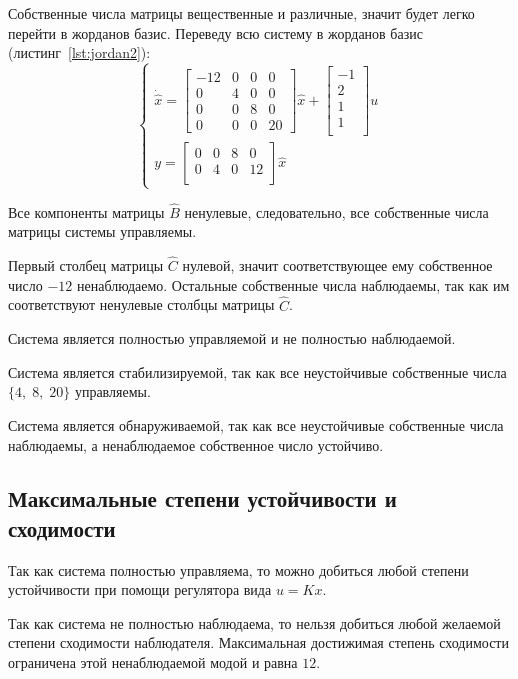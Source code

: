 \documentclass[a4paper,12pt]{article}
\begin{document}
	Собственные числа матрицы вещественные и различные, значит будет легко перейти в жорданов базис. Переведу всю систему в жорданов базис (листинг~\ref{lst:jordan2}):
	\[
	\begin{cases}
		\dot{\hat x} =
		\begin{bmatrix}
			-12 & 0 & 0 & 0 \\
			0 & 4 & 0 & 0 \\
			0 & 0 & 8 & 0 \\
			0 & 0 & 0 & 20
		\end{bmatrix}
		\hat x
		+ \begin{bmatrix}
			-1 \\ 2 \\ 1 \\ 1 \\
		\end{bmatrix} u
		\\[30pt]
		y = 
		\begin{bmatrix}
			0 & 0 & 8 & 0 \\
			0 & 4 & 0 & 12 \\
		\end{bmatrix}
		\hat x
	\end{cases}
	\]
	
Все компоненты матрицы \(\hat B\) ненулевые, следовательно, все собственные числа матрицы системы управляемы.

Первый столбец матрицы \(\hat C\) нулевой, значит соответствующее ему собственное число \(-12\) ненаблюдаемо. Остальные собственные числа наблюдаемы, так как им соответствуют ненулевые столбцы матрицы \(\hat C\).

Система является полностью управляемой и не полностью наблюдаемой.

Система является стабилизируемой, так как все неустойчивые собственные числа \(\{4,\; 8,\; 20\}\) управляемы.

Система является обнаруживаемой, так как все неустойчивые собственные числа наблюдаемы, а ненаблюдаемое собственное число устойчиво.
	
	\subsection{Максимальные степени устойчивости и сходимости}
	
	Так как система полностью управляема, то можно добиться любой степени устойчивости при помощи регулятора вида \(u = K x\).
	
	Так как система не полностью наблюдаема, то нельзя добиться любой желаемой степени сходимости наблюдателя. Максимальная достижимая степень сходимости ограничена этой ненаблюдаемой модой и равна \(12\). 
	
\end{document}
